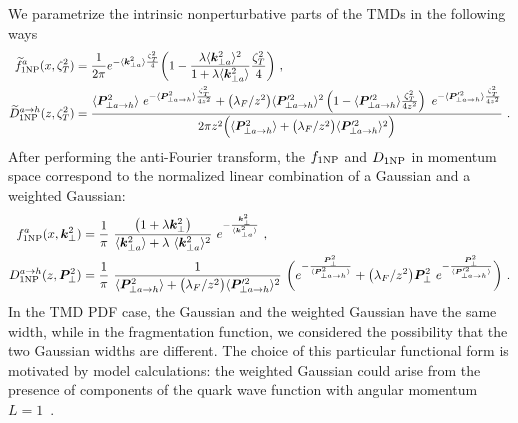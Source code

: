 \documentclass[aps,preprintnumbers,showpacs,nofootinbib,superscriptaddress,floatfix]{revtex4}
\newcommand{\T}{\perp}
\newcommand{\bT}{\zeta_T}
\begin{document}
We parametrize the intrinsic nonperturbative parts of the TMDs in the
following ways
\begin{align}
\widetilde{f}_{1 {\rm NP}}^a (x, \bT^2) &= \frac{1}{2\pi}
        e^{-\langle \bm{k}_{\T a}^2 \rangle \frac{\bT^2}{4}}
        \bigg( 1 - \frac{\lambda \langle \bm{k}_{\T a}^2 \rangle^2}{1+\lambda\langle \bm{k}_{\T a}^2 \rangle}  \frac{\bT^2}{4} \bigg)\  ,
\label{e:f1NP} \\
\widetilde{D}_{1 {\rm NP}}^{a \to h} (z, \bT^2) &= 
    \frac{ \langle \bm{P}_{\T a\to h}^2 \rangle \   e^{-\langle \bm{P}_{\T
          a\to h}^2 \rangle \frac{\bT^2}{4 z^2}}
        + \big(\lambda_F/z^2\big)    \langle \bm{P}_{\T a\to h}'^2 \rangle^2
    \left(1 - \langle \bm{P}_{\T a\to h}'^2 \rangle \frac{\bT^2}{4 z^2} \right)
         \  e^{- \langle \bm{P}_{\T a\to h}'^2 \rangle \frac{\bT^2}{4z^2}}}
     {2 \pi z^2 \Big(\langle \bm{P}_{\T a\to h}^2 \rangle + \big(\lambda_F/z^2\big)   \langle \bm{P}_{\T a\to h}'^2 \rangle^2\Big)} \  .
\label{e:D1NP}
\end{align} 
After performing the anti-Fourier transform, the $f_{1 \rm NP}$ and $D_{1\rm
  NP}$ in momentum space correspond to the normalized linear combination of
a Gaussian and a weighted Gaussian:
\begin{align} 
f_{1 {\rm NP}}^a (x, \bm{k}_{\T}^2) &= \frac{1}{\pi} \  
                        \frac{\big( 1 +\lambda \bm{k}_{\T}^2\big)}
                                {\langle \bm{k}_{\T a}^2 \rangle +\lambda \  \langle \bm{k}_{\T a}^2 \rangle^2}
                        \  e^{- \frac{\bm{k}_{\T}^2}{\langle \bm{k}_{\T a}^2 \rangle}} \  ,
\label{e:f1NPk}   \\
D_{1 {\rm NP}}^{a\to h} (z, \bm{P}_{\T}^2) &=  \frac{1}{\pi} \   
                  \frac{1}{\langle \bm{P}_{\T a\to h}^2 \rangle +
                    \big(\lambda_F/z^2\big) \langle \bm{P}_{\T a\to h}'^2 \rangle^2}
           \   \bigg( e^{- \frac{\bm{P}_{\T}^2}{\langle \bm{P}_{\T a\to h}^2 \rangle}}
                            + \big(\lambda_F/z^2\big)   \bm{P}_{\T}^2 \  
           e^{- \frac{\bm{P}_{\T}^2}{\langle \bm{P}_{\T a\to h}'^2 \rangle}} \bigg) \  .
\label{e:D1NPk}
\end{align} 
In the TMD PDF case, the Gaussian and the
weighted Gaussian have the same width, while in the fragmentation function, we
considered the possibility that the two Gaussian widths are different. 
The choice of this particular functional form is motivated by model
calculations: the weighted Gaussian could arise from 
the presence of components of the quark wave function 
with angular momentum
$L=1$~\cite{Bacchetta:2007wc,Pasquini:2008ax,Avakian:2010br,Bacchetta:2010si,Burkardt:2015qoa}.   
\end{document}
